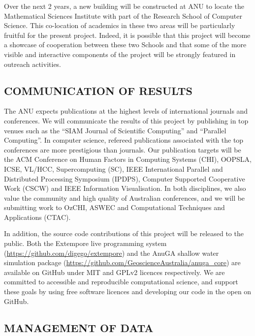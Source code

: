 \documentclass[a4paper,fontsize=12pt]{scrartcl}
\begin{document}
Over the next 2 years, a new building will be constructed at ANU to
locate the Mathematical Sciences Institute with part of the Research
School of Computer Science. This co-location of academics in these two
areas will be particularly fruitful for the present project. Indeed,
it is possible that this project will become a showcase of cooperation
between these two Schools and that some of the more visible and
interactive components of the project will be strongly featured in
outreach activities.




\subsection*{COMMUNICATION OF RESULTS}

The ANU expects publications at the highest levels of international
journals and conferences. We will communicate the results of this
project by publishing in top venues such as the ``SIAM Journal of
Scientific Computing'' and ``Parallel Computing''. In computer
science, refereed publications associated with the top conferences are
more prestigious than journals. Our publication targets will be the
ACM Conference on Human Factors in Computing Systems (CHI), OOPSLA,
ICSE, VL/HCC, Supercomputing (SC), IEEE International Parallel and Distributed Processing Symposium (IPDPS), Computer Supported Cooperative Work
(CSCW) and IEEE Information Visualisation. In both disciplines, we
also value the community and high quality of Australian conferences,
and we will be submitting work to OzCHI, ASWEC and Computational
Techniques and Applications (CTAC).


In addition, the source code contributions of this project will be
released to the public. Both the Extempore live programming system
(\url{https://github.com/digego/extempore}) and the AnuGA shallow
water simulation package
(\url{https://github.com/GeoscienceAustralia/anuga_core}) are
available on GitHub under MIT and GPLv2 licences respectively. We are
committed to accessible and reproducible computational science, and
support these goals by using free software licences and developing our
code in the open on GitHub.

\subsection*{MANAGEMENT OF DATA}
\end{document}

